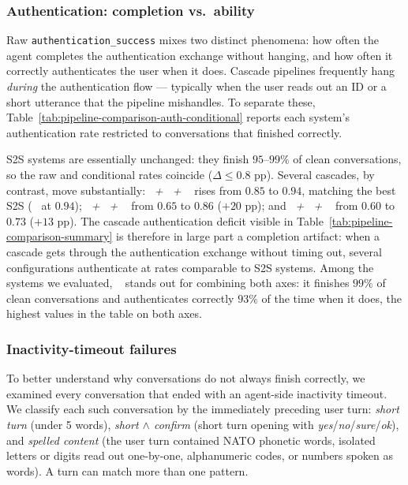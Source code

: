 


\subsubsection{Authentication: completion vs.\ ability}
\label{app:pipeline-comparison-auth-conditional}

Raw \texttt{authentication\_success} mixes two distinct phenomena: how often the agent completes the authentication exchange without hanging, and how often it correctly authenticates the user when it does. Cascade pipelines frequently hang \emph{during} the authentication flow — typically when the user reads out an ID or a short utterance that the pipeline mishandles. To separate these, Table~\ref{tab:pipeline-comparison-auth-conditional} reports each system's authentication rate restricted to conversations that finished correctly.

S2S systems are essentially unchanged: they finish $95$--$99\%$ of clean conversations, so the raw and conditional rates coincide ($\Delta \leq 0.8$ pp). Several cascades, by contrast, move substantially: \emph{\novafull~+ \gptfull~+ \sonicfull~} rises from $0.85$ to $0.94$, matching the best S2S (\emph{\gptrealtimefull~} at $0.94$); \emph{\inkfull~+ \haikufull~+ \sonicfull~} from $0.65$ to $0.86$ ($+20$ pp); and \emph{\whisperfull~+ \qwenfull~+ \voxtralfull~} from $0.60$ to $0.73$ ($+13$ pp). The cascade authentication deficit visible in Table~\ref{tab:pipeline-comparison-summary} is therefore in large part a completion artifact: when a cascade gets through the authentication exchange without timing out, several configurations authenticate at rates comparable to S2S systems. Among the systems we evaluated, \emph{\gptrealtimefull~} stands out for combining both axes: it finishes $99\%$ of clean conversations and authenticates correctly $93\%$ of the time when it does, the highest values in the table on both axes.



\subsubsection{Inactivity-timeout failures}
\label{app:pipeline-comparison-failure-modes}

To better understand why conversations do not always finish correctly, we examined every conversation that ended with an agent-side inactivity timeout. We classify each such
conversation by the immediately preceding user turn: \emph{short turn}
(under 5 words), \emph{short $\wedge$ confirm} (short turn opening with
\emph{yes}/\emph{no}/\emph{sure}/\emph{ok}), and \emph{spelled content}
(the user turn contained NATO phonetic words, isolated letters or digits
read out one-by-one, alphanumeric codes, or numbers spoken as words).
A turn can match more than one pattern.

